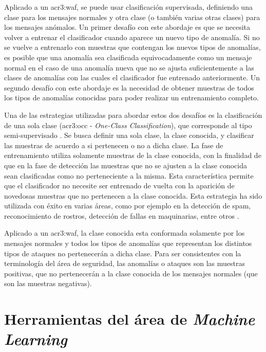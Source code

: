 Aplicado a un \gls{acr3:waf}, se puede usar clasificación supervisada,
definiendo una clase para los mensajes normales y otra clase (o también
varias otras clases) para los mensajes anómalos.
Un primer desafío con este abordaje es que se necesita volver a entrenar
el clasificador cuando aparece un nuevo tipo de anomalía. Si no se vuelve
a entrenarlo con muestras que contengan los nuevos tipos de anomalías, es
posible que una anomalía sea clasificada equivocadamente como un mensaje
normal en el caso de una anomalía nueva que no se ajusta suficientemente
a las clases de anomalías con las cuales el clasificador fue entrenado
anteriormente.
Un segundo desafío con este abordaje es la necesidad de obtener muestras
de todos los tipos de anomalías conocidas para poder realizar un
entrenamiento completo.

Una de las estrategias utilizadas para abordar estos dos desafíos es
la clasificación de una sola clase (\gls{acr3:occ} - \textit{One-Class Classification}),
que corresponde al tipo semi-supervisado
\citep{khan2009survey}. %
Se busca definir una sola clase, la clase conocida, y clasificar las
muestras de acuerdo a si pertenecen o no a dicha clase. La fase de
entrenamiento utiliza solamente muestras de la clase conocida, con la
finalidad de que en la fase de detección las muestras que no se ajusten
a la clase conocida sean clasificadas como no perteneciente a la misma.
Esta característica permite que el clasificador no necesite ser entrenado
de vuelta con la aparición de novedosas muestras que no pertenecen a la
clase conocida.
Esta estrategia ha sido utilizada con éxito en varias áreas, como por
ejemplo en la detección de spam, reconocimiento de rostros, detección
de fallas en maquinarias, entre otros
\citep{khan2014one}. %

Aplicado a un \gls{acr3:waf}, la clase conocida esta conformada solamente
por los mensajes normales y todos los tipos de anomalías que representan
los distintos tipos de ataques no pertenecerán a dicha clase. Para ser
consistentes con la terminología del área de seguridad, las anomalías o
ataques son las muestras positivas, que no pertenecerán a la clase conocida
de los mensajes normales (que son las muestras negativas).


\section{Herramientas del área de \textit{Machine Learning}}

